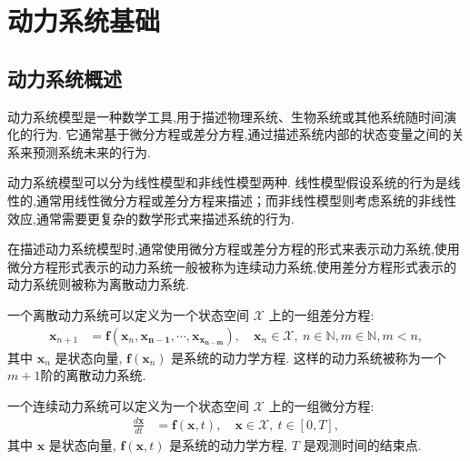 \chapter{动力系统基础}\label{chap:dynamic}


\section{动力系统概述}
动力系统模型是一种数学工具,用于描述物理系统、生物系统或其他系统随时间演化的行为. 它通常基于微分方程或差分方程,通过描述系统内部的状态变量之间的关系来预测系统未来的行为. 

动力系统模型可以分为线性模型和非线性模型两种. 线性模型假设系统的行为是线性的,通常用线性微分方程或差分方程来描述；而非线性模型则考虑系统的非线性效应,通常需要更复杂的数学形式来描述系统的行为. 

在描述动力系统模型时,通常使用微分方程或差分方程的形式来表示动力系统,使用微分方程形式表示的动力系统一般被称为连续动力系统,使用差分方程形式表示的动力系统则被称为离散动力系统. 
\begin{defn}[离散动力系统]\cite{strogatz2018nonlinear}
    一个离散动力系统可以定义为一个状态空间 $\mathcal{X}$ 上的一组差分方程:
    \begin{equation}\label{eq:discrete_dynamic_system}
        \begin{aligned}
            \mathbf{x}_{n+1} & = \mathbf{f}(\mathbf{x}_n,\mathbf{x_{n-1}},\cdots,\mathbf{x_{x_{n-m}}}), \quad \mathbf{x}_n \in \mathcal{X}, \ n \in \mathbb{N},m\in\mathbb{N},m<n,
        \end{aligned}
    \end{equation}
    其中 $\mathbf{x}_n$ 是状态向量, $\mathbf{f}(\mathbf{x}_n)$ 是系统的动力学方程. 这样的动力系统被称为一个$m+1$阶的离散动力系统. 
\end{defn}

\begin{defn}[连续动力系统]\cite{strogatz2018nonlinear}
    一个连续动力系统可以定义为一个状态空间 $\mathcal{X}$ 上的一组微分方程:
    \begin{equation}\label{eq:dynamic_system}
        \begin{aligned}
            \frac{d\mathbf{x}}{dt} & = \mathbf{f}(\mathbf{x}, t), \quad \mathbf{x} \in \mathcal{X}, \ t \in [0, T],
        \end{aligned}
    \end{equation}
    其中 $\mathbf{x}$ 是状态向量, $\mathbf{f}(\mathbf{x}, t)$ 是系统的动力学方程, $T$ 是观测时间的结束点. 
\end{defn}

